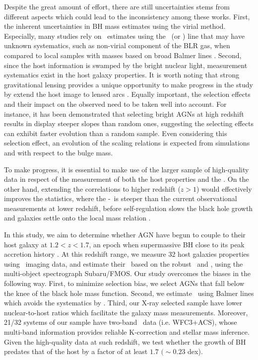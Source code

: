 \documentclass[apj]{emulateapj}
\begin{document}
Despite the great amount of effort, there are still uncertainties stems from different aspects which could lead to the inconsistency among these works. First, the inherent uncertainties in BH mass estimates using the virial method. Especially, many studies rely on \mbh\ estimates using the \Civ\ (or \Mgii) line that may have unknown systematics, such as non-virial component of the BLR gas, when compared to local samples with masses based on broad Balmer lines \citep[i.e. \halpha\ and \hbeta,][]{Schulze2018, Baskin2005, Trakhtenbrot2012}. Second, since the host information is swamped by the bright nuclear light, measurement systematics exist in the host galaxy properties. It is worth noting that strong gravitational lensing provides a unique opportunity to make progress in the study by extend the host image to lensed arcs \citep{Pen++06qsob, Ding2017a, Ding2017b}. Equally important,
the selection effects and their impact on the observed need to be taken well into account. For instance, it has been demonstrated \citep{Schulze2011, Schulze2014} that selecting bright AGNs at high redshift results in display steeper slopes than random ones, suggesting the selecting effects can exhibit faster evolution than a random sample. Even considering this selection effect, an evolution of the scaling relations is expected from simulations \citep{DeG++15} and with respect to the bulge mass.

To make progress, it is essential to make use of the larger sample of high-quality data in respect of the measurement of both the host properties and the \mbh. On the other hand, extending the correlations to higher redshift ($z>1$) would effectively improves the statistics, where the \mbh-\lhost\ is steeper than the current observational measurements at lower redshift, before self-regulation slows the black hole growth and galaxies settle onto the local mass relation \citep{DeG++15}.

In this study, we aim to determine whether AGN have begun to couple to their host galaxy at $1.2<z<1.7$, an epoch when supermassive BH close to its peak accretion history \citep{Aird2015}.  At this redshift range, we measure 32 host galaxies properties using \hst\ imaging data, and estimate their \mbh\ based on the robust \halpha\ and \hbeta, using the multi-object spectrograph Subaru/FMOS. Our study overcomes the biases in the following way. First, to minimize selection bias, we select AGNs that fall below the knee of the black hole mass function. Second, we estimate \mbh\ using Balmer lines which avoids the systematics by \Mgii. Third, our X-ray selected sample have lower nuclear-to-host ratios which facilitate the galaxy mass measurements. Moreover, 21/32 systems of our sample have two-band \hst\ data (i.e. WFC3+ACS), whose multi-band information provides reliable K-correction and stellar mass inference. Given the high-quality data at such redshift, we test whether the growth of BH predates that of the host by a factor of at least $1.7$ $(\sim0.23$ dex). 
\end{document}

